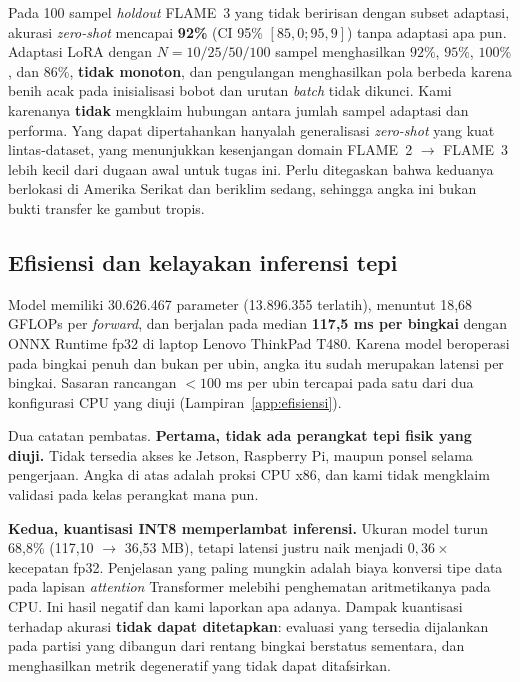 Pada 100 sampel \emph{holdout} FLAME~3 yang tidak beririsan dengan subset
adaptasi, akurasi \emph{zero-shot} mencapai \textbf{92\%} (CI 95\%
$[85{,}0; 95{,}9]$) tanpa adaptasi apa pun. Adaptasi LoRA dengan
$N = 10/25/50/100$ sampel menghasilkan $92\%$, $95\%$, $100\%$, dan $86\%$,
\textbf{tidak monoton}, dan pengulangan menghasilkan pola berbeda karena benih
acak pada inisialisasi bobot dan urutan \emph{batch} tidak dikunci. Kami
karenanya \textbf{tidak} mengklaim hubungan antara jumlah sampel adaptasi dan
performa. Yang dapat dipertahankan hanyalah generalisasi \emph{zero-shot} yang
kuat lintas-dataset, yang menunjukkan kesenjangan domain FLAME~2
$\rightarrow$ FLAME~3 lebih kecil dari dugaan awal untuk tugas ini. Perlu
ditegaskan bahwa keduanya berlokasi di Amerika Serikat dan beriklim sedang,
sehingga angka ini bukan bukti transfer ke gambut tropis.

\subsection{Efisiensi dan kelayakan inferensi tepi}

Model memiliki 30.626.467 parameter (13.896.355 terlatih), menuntut 18{,}68
GFLOPs per \emph{forward}, dan berjalan pada median \textbf{117{,}5 ms per
bingkai} dengan ONNX Runtime fp32 di laptop Lenovo ThinkPad T480. Karena model
beroperasi pada bingkai penuh dan bukan per ubin, angka itu sudah merupakan
latensi per bingkai. Sasaran rancangan $<100$ ms per ubin tercapai pada satu
dari dua konfigurasi CPU yang diuji (Lampiran~\ref{app:efisiensi}).

Dua catatan pembatas. \textbf{Pertama, tidak ada perangkat tepi fisik yang
diuji.} Tidak tersedia akses ke Jetson, Raspberry Pi, maupun ponsel selama
pengerjaan. Angka di atas adalah proksi CPU x86, dan kami tidak mengklaim
validasi pada kelas perangkat mana pun.

\textbf{Kedua, kuantisasi INT8 memperlambat inferensi.} Ukuran model turun
68{,}8\% (117{,}10 $\rightarrow$ 36{,}53 MB), tetapi latensi justru naik menjadi
$0{,}36\times$ kecepatan fp32.
Penjelasan yang paling mungkin adalah biaya konversi tipe data pada lapisan
\emph{attention} Transformer melebihi penghematan aritmetikanya pada CPU. Ini
hasil negatif dan kami laporkan apa adanya. Dampak kuantisasi terhadap akurasi
\textbf{tidak dapat ditetapkan}: evaluasi yang tersedia dijalankan pada partisi
yang dibangun dari rentang bingkai berstatus sementara, dan menghasilkan
metrik degeneratif yang tidak dapat ditafsirkan.

